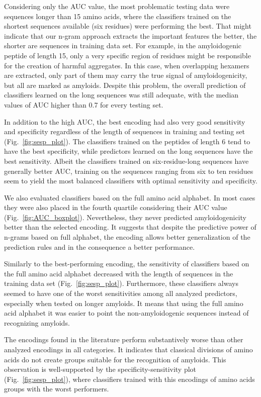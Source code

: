 \documentclass[a4,center,fleqn]{NAR}
\begin{document}
  Considering only the AUC value, the most problematic testing data were 
sequences longer than 15 amino acids, where the classifiers trained on the 
shortest sequences available (six residues) were performing the best. That might 
indicate that our n-gram approach extracts the important features the better, 
the shorter are sequences in training data set. For example, in the 
amyloidogenic peptide of length 15, only a very specific region of residues 
might be responsible for the creation of harmful aggregates. In this case, when 
overlapping hexamers are extracted, only part of them may carry the true signal 
of amyloidogenicity, but all are marked as amyloids. Despite this problem, the 
overall prediction of classifiers learned on the long sequences was still 
adequate, with the median values of AUC higher than 0.7 for every testing set. 

  In addition to the high AUC, the best encoding had also very good sensitivity 
and specificity regardless of the length of sequences in training and testing 
set (Fig.~\ref{fig:sesp_plot}). The classifiers trained on the peptides of 
length 6 tend to have the best specificity, while predictors learned on the long 
sequences have the best sensitivity. Albeit the classifiers trained on 
six-residue-long sequences have generally better AUC, training on the sequences 
ranging from six to ten residues seem to yield the most balanced classifiers 
with optimal sensitivity and specificity.

  We also evaluated classifiers based on the full amino acid alphabet. In most 
cases they were also placed in the fourth quartile considering their AUC value 
(Fig.~\ref{fig:AUC_boxplot}). Nevertheless, they never predicted 
amyloidogenicity better than the selected encoding. It suggests that despite the 
predictive power of n-grams based on full alphabet, the encoding allows better 
generalization of the prediction rules and in the consequence a better 
performance.

  Similarly to the best-performing encoding, the sensitivity of classifiers 
based on the full amino acid alphabet decreased with the length of sequences in 
the training data set (Fig.~\ref{fig:sesp_plot}). Furthermore, these classifiers 
always seemed to  have one of the worst sensitivities among all analyzed 
predictors, especially when tested on longer amyloids. It means that using the 
full amino acid alphabet it was easier to point the non-amyloidogenic sequences 
instead of recognizing amyloids.

  The encodings found in the literature perform substantively worse than other 
analyzed encodings in all categories. It indicates that 
classical divisions of amino acids do not create groups suitable for the 
recognition of amyloids. This observation is well-supported by the 
specificity-sensitivity plot (Fig.~\ref{fig:sesp_plot}), where classifiers 
trained with this encodings of amino acids groups with the worst performers.
\end{document}

